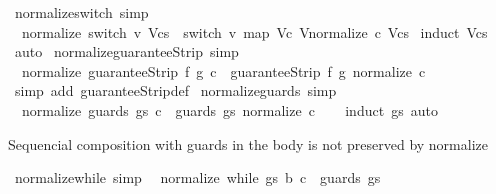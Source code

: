 \begin{isabellebody}
\isanewline
%
\endisadelimproof
\isanewline
{}\isamarkupfalse%
\ normalize{\isacharunderscore}switch\ {\isacharbrackleft}simp{\isacharbrackright}{\isacharcolon}\isanewline
\ \ {\isachardoublequoteopen}normalize\ {\isacharparenleft}switch\ v\ Vcs{\isacharparenright}\ {\isacharequal}\ switch\ v\ {\isacharparenleft}map\ {\isacharparenleft}{\isasymlambda}{\isacharparenleft}V{\isacharcomma}c{\isacharparenright}{\isachardot}\ {\isacharparenleft}V{\isacharcomma}normalize\ c{\isacharparenright}{\isacharparenright}\ Vcs{\isacharparenright}{\isachardoublequoteclose}\isanewline
%
\isadelimproof
%
\endisadelimproof
%
\isatagproof
{}\isamarkupfalse%
\ {\isacharparenleft}induct\ Vcs{\isacharparenright}\isanewline
{}\isamarkupfalse%
\ auto\isanewline
{}\isamarkupfalse%
%
\endisatagproof
{\isafoldproof}%
%
\isadelimproof
\isanewline
%
\endisadelimproof
\isanewline
{}\isamarkupfalse%
\ normalize{\isacharunderscore}guaranteeStrip\ {\isacharbrackleft}simp{\isacharbrackright}{\isacharcolon}\isanewline
\ \ {\isachardoublequoteopen}normalize\ {\isacharparenleft}guaranteeStrip\ f\ g\ c{\isacharparenright}\ {\isacharequal}\ guaranteeStrip\ f\ g\ {\isacharparenleft}normalize\ c{\isacharparenright}{\isachardoublequoteclose}\isanewline
%
\isadelimproof
\ \ %
\endisadelimproof
%
\isatagproof
{}\isamarkupfalse%
\ {\isacharparenleft}simp\ add{\isacharcolon}\ guaranteeStrip{\isacharunderscore}def{\isacharparenright}%
\endisatagproof
{\isafoldproof}%
%
\isadelimproof
\isanewline
%
\endisadelimproof
\isanewline
{}\isamarkupfalse%
\ normalize{\isacharunderscore}guards\ {\isacharbrackleft}simp{\isacharbrackright}{\isacharcolon}\isanewline
\ \ {\isachardoublequoteopen}normalize\ {\isacharparenleft}guards\ gs\ c{\isacharparenright}\ {\isacharequal}\ guards\ gs\ {\isacharparenleft}normalize\ c{\isacharparenright}{\isachardoublequoteclose}\isanewline
%
\isadelimproof
\ \ %
\endisadelimproof
%
\isatagproof
{}\isamarkupfalse%
\ {\isacharparenleft}induct\ gs{\isacharparenright}\ auto%
\endisatagproof
{\isafoldproof}%
%
\isadelimproof
%
\endisadelimproof
%
\begin{isamarkuptext}%
Sequencial composition with guards in the body is not preserved by
        normalize%
\end{isamarkuptext}\isamarkuptrue%
\isamarkupfalse%
\ normalize{\isacharunderscore}while\ {\isacharbrackleft}simp{\isacharbrackright}{\isacharcolon}\isanewline
\ \ {\isachardoublequoteopen}normalize\ {\isacharparenleft}while\ gs\ b\ c{\isacharparenright}\ {\isacharequal}\ guards\ gs\isanewline

\end{isabellebody}
